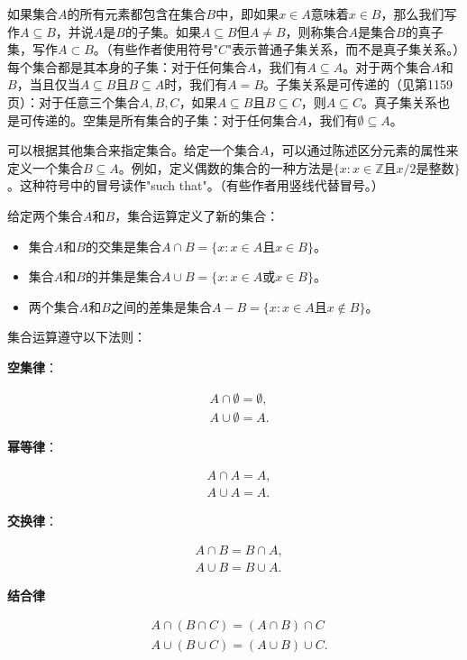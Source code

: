 \documentclass[lang=cn,newtx,10pt,scheme=chinese]{elegantbook}
\begin{document}
如果集合$A$的所有元素都包含在集合$B$中，即如果$x \in A$意味着$x \in B$，那么我们写作$A \subseteq B$，并说$A$是$B$的子集。如果$A \subseteq B$但$A \neq B$，则称集合$A$是集合$B$的真子集，写作$A \subset B$。（有些作者使用符号"$C$"表示普通子集关系，而不是真子集关系。）每个集合都是其本身的子集：对于任何集合$A$，我们有$A \subseteq A$。对于两个集合$A$和$B$，当且仅当$A \subseteq B$且$B \subseteq A$时，我们有$A=B$。子集关系是可传递的（见第1159页）：对于任意三个集合$A,B,C$，如果$A \subseteq B$且$B \subseteq C$，则$A \subseteq C$。真子集关系也是可传递的。空集是所有集合的子集：对于任何集合$A$，我们有$\emptyset \subseteq A$。

可以根据其他集合来指定集合。给定一个集合$A$，可以通过陈述区分元素的属性来定义一个集合$B\subseteq A$。例如，定义偶数的集合的一种方法是$\{x: x \in \mathbb{Z}$且$x / 2$是整数$\}$。这种符号中的冒号读作"such that"。（有些作者用竖线代替冒号。）

给定两个集合$A$和$B$，集合运算定义了新的集合：

\begin{itemize}
\item 集合$A$和$B$的交集是集合$A \cap B=\{x: x \in A$且$x \in B\}$。
\item 集合$A$和$B$的并集是集合$A \cup B=\{x: x \in A$或$x \in B\}$。
\item 两个集合$A$和$B$之间的差集是集合$A-B=\{x: x \in A$且$x \notin B\}$。
\end{itemize}

集合运算遵守以下法则：

\textbf{空集律}：

$$
\begin{aligned}
& A \cap \emptyset=\emptyset, \\
& A \cup \emptyset=A .
\end{aligned}
$$

\textbf{幂等律}：

$$
\begin{aligned}
& A \cap A=A, \\
& A \cup A=A .
\end{aligned}
$$

\textbf{交换律}：

$$
\begin{aligned}
& A \cap B=B \cap A, \\
& A \cup B=B \cup A .
\end{aligned}
$$

\textbf{结合律}

$$
\begin{aligned}
& A \cap(B \cap C)=(A \cap B) \cap C \\
& A \cup(B \cup C)=(A \cup B) \cup C .
\end{aligned}
$$
\end{document}
